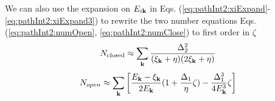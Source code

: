 \documentclass[reprint,pra]{revtex4-1}
\begin{document}
We can also use the expansion on $E_{i\mathbf{k}}$ in Eqs. (\ref{eq:pathInt2:xiExpand}-\ref{eq:pathInt2:xiExpand3}) to rewrite the two number equations Eqs. (\ref{eq:pathInt2:numOpen}, \ref{eq:pathInt2:numClose}) to  first order in $\zeta$ 
\begin{gather}\label{eq:pathInt2:closeD2}
N_{\text{closed}}\approx\sum_{\mathbf{k}}\frac{\Delta_{2}^2}{(\xi_{\mathbf{k}}+\eta)(2\xi_{\mathbf{k}}+\eta)}
\end{gather}
\begin{equation}
\begin{split}
N_{open}\approx\sum_{\mathbf{k}}\left[\frac{E_{\mathbf{k}}-\xi_{\mathbf{k}}}{2E_{\mathbf{k}}}(1+\frac{\Delta_{1}}{\eta}\zeta)-\frac{\Delta_{1}^{3}}{4E_{\mathbf{k}}^{3}}\zeta
	\right]	
\end{split}
\end{equation}



%
%
%
%  
%  
%  
%  
%
\end{document}
